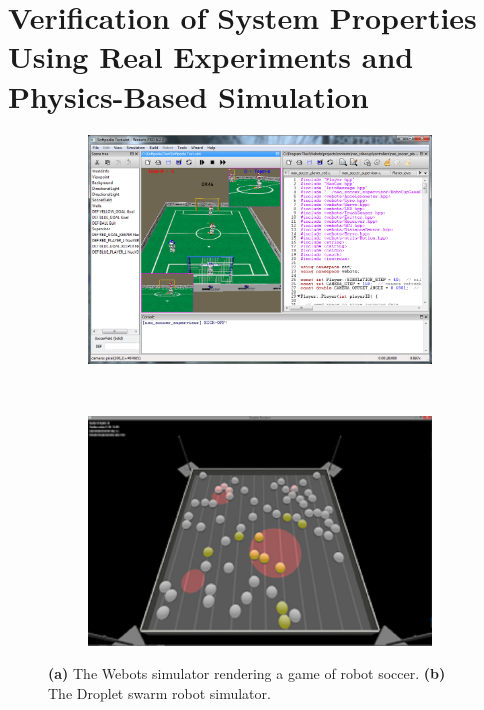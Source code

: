 \documentclass[12pt]{book}
\begin{document}
\section{Verification of System Properties Using Real Experiments and\\Physics-Based Simulation}
\begin{figure}[!tb]
\begin{subfigure}{.5\textwidth}
\centering\includegraphics[width=\textwidth]{../assets/Webots.png}
\centering\caption{}\label{fig:webots}
\end{subfigure}~
\begin{subfigure}{.5\textwidth}
\centering\includegraphics[width=\textwidth]{../assets/newsim.png}
\centering\caption{}\label{fig:dropletsim}
\end{subfigure}
\caption{\textbf{(a)} The Webots simulator rendering a game of robot soccer. \textbf{(b)} The Droplet swarm robot simulator.}
\end{figure}
\end{document}
